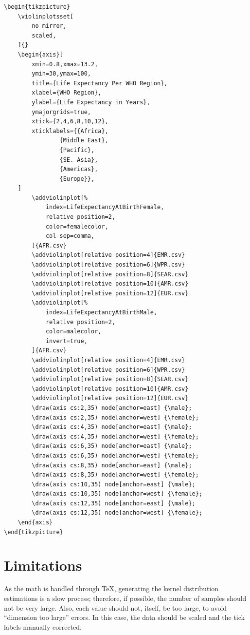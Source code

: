 \documentclass{article}
\begin{document}
\begin{verbatim}
\begin{tikzpicture}
	\violinplotsset[
		no mirror,
		scaled,
	]{}
	\begin{axis}[
		xmin=0.8,xmax=13.2,
		ymin=30,ymax=100,
		title={Life Expectancy Per WHO Region},
		xlabel={WHO Region},
		ylabel={Life Expectancy in Years},
		ymajorgrids=true,
		xtick={2,4,6,8,10,12},
		xticklabels={{Africa},
				{Middle East},
				{Pacific},
				{SE. Asia},
				{Americas},
				{Europe}},
	]
		\addviolinplot[%
			index=LifeExpectancyAtBirthFemale,
			relative position=2,
			color=femalecolor,
			col sep=comma,
		]{AFR.csv}
		\addviolinplot[relative position=4]{EMR.csv}
		\addviolinplot[relative position=6]{WPR.csv}
		\addviolinplot[relative position=8]{SEAR.csv}
		\addviolinplot[relative position=10]{AMR.csv}
		\addviolinplot[relative position=12]{EUR.csv}
		\addviolinplot[%
			index=LifeExpectancyAtBirthMale,
			relative position=2,
			color=malecolor,
			invert=true,
		]{AFR.csv}
		\addviolinplot[relative position=4]{EMR.csv}
		\addviolinplot[relative position=6]{WPR.csv}
		\addviolinplot[relative position=8]{SEAR.csv}
		\addviolinplot[relative position=10]{AMR.csv}
		\addviolinplot[relative position=12]{EUR.csv}
		\draw(axis cs:2,35) node[anchor=east] {\male};
		\draw(axis cs:2,35) node[anchor=west] {\female};
		\draw(axis cs:4,35) node[anchor=east] {\male};
		\draw(axis cs:4,35) node[anchor=west] {\female};
		\draw(axis cs:6,35) node[anchor=east] {\male};
		\draw(axis cs:6,35) node[anchor=west] {\female};
		\draw(axis cs:8,35) node[anchor=east] {\male};
		\draw(axis cs:8,35) node[anchor=west] {\female};
		\draw(axis cs:10,35) node[anchor=east] {\male};
		\draw(axis cs:10,35) node[anchor=west] {\female};
		\draw(axis cs:12,35) node[anchor=east] {\male};
		\draw(axis cs:12,35) node[anchor=west] {\female};
	\end{axis}
\end{tikzpicture}
\end{verbatim}

\section{Limitations}

As the math is handled through \TeX, generating the kernel distribution
estimations is a slow process; therefore, if possible, the number of samples
should not be very large. Also, each value should not, itself, be too large,
to avoid ``dimension too large'' errors. In this case, the data should be scaled
and the tick labels manually corrected.
\end{document}
